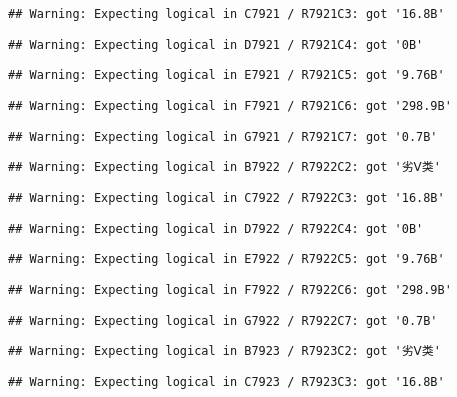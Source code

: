 \documentclass[
]{article}
\begin{document}
\begin{verbatim}
## Warning: Expecting logical in C7921 / R7921C3: got '16.8B'
\end{verbatim}

\begin{verbatim}
## Warning: Expecting logical in D7921 / R7921C4: got '0B'
\end{verbatim}

\begin{verbatim}
## Warning: Expecting logical in E7921 / R7921C5: got '9.76B'
\end{verbatim}

\begin{verbatim}
## Warning: Expecting logical in F7921 / R7921C6: got '298.9B'
\end{verbatim}

\begin{verbatim}
## Warning: Expecting logical in G7921 / R7921C7: got '0.7B'
\end{verbatim}

\begin{verbatim}
## Warning: Expecting logical in B7922 / R7922C2: got '劣Ⅴ类'
\end{verbatim}

\begin{verbatim}
## Warning: Expecting logical in C7922 / R7922C3: got '16.8B'
\end{verbatim}

\begin{verbatim}
## Warning: Expecting logical in D7922 / R7922C4: got '0B'
\end{verbatim}

\begin{verbatim}
## Warning: Expecting logical in E7922 / R7922C5: got '9.76B'
\end{verbatim}

\begin{verbatim}
## Warning: Expecting logical in F7922 / R7922C6: got '298.9B'
\end{verbatim}

\begin{verbatim}
## Warning: Expecting logical in G7922 / R7922C7: got '0.7B'
\end{verbatim}

\begin{verbatim}
## Warning: Expecting logical in B7923 / R7923C2: got '劣Ⅴ类'
\end{verbatim}

\begin{verbatim}
## Warning: Expecting logical in C7923 / R7923C3: got '16.8B'
\end{verbatim}
\end{document}
